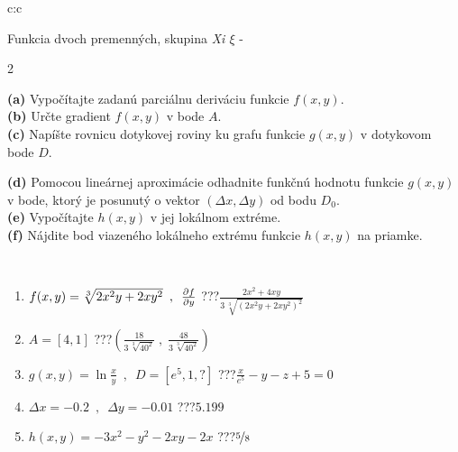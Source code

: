 \documentclass[10pt]{report}
\begin{document}
\begin{tabular}{c:c}
\begin{minipage}[c][104.5mm][t]{0.5\linewidth}
\begin{center}
\vspace{7mm}
{\huge \LARGE Funkcia dvoch premenných, skupina \textit{Xi $\xi$} -}\\[5mm]
\begin{minipage}{0.95\linewidth}
\begin{center}
{\small \begin{multicols}{2} \raggedright
\textbf{(a)} Vypočítajte zadanú parciálnu deriváciu funkcie \(f(x,y)\). \\[1mm]
\textbf{(b)} Určte gradient \(f(x,y)\) v bode \(A\). \\[1mm]
\textbf{(c)} Napíšte rovnicu dotykovej roviny ku grafu funkcie \(g(x,y)\) v dotykovom bode \(D\). \par \columnbreak
\textbf{(d)} Pomocou lineárnej aproximácie odhadnite funkčnú hodnotu funkcie \(g(x,y)\) v bode, ktorý je posunutý o vektor \((\Delta x, \Delta y)\) od bodu \(D_0\). \\[1mm]
\textbf{(e)} Vypočítajte \(h(x,y)\) v jej lokálnom extréme. \\[1mm]
\textbf{(f)} Nájdite bod viazeného lokálneho extrému funkcie \(h(x,y)\) na priamke. \\[1mm]
\end{multicols}
}
\end{center}
\end{minipage}
\\[4mm]
\begin{minipage}{0.79\linewidth}
\begin{center}
\begin{varwidth}{\linewidth}
\begin{enumerate}
\normalsizerr
\item $f(x,y) = \sqrt[3]{2x^2y + 2xy^2}\enspace , \enspace \pdv{f}{y}$\quad \dotfill\; ???\;\dotfill \quad $\frac{2x^2+4xy}{3\,\sqrt[3]{(2x^2y+2xy^2)^{2}}}$
\item $A = [4, 1]$\quad \dotfill\; ???\;\dotfill \quad $\left( \frac{18}{3\,\sqrt[3]{40^2}} \;,\; \frac{48}{3\,\sqrt[3]{40^2}} \right)$
\item $g(x,y) = \ln\frac{x}{y} \enspace , \enspace D=[e^{5},1,?]$\quad \dotfill\; ???\;\dotfill \quad $\frac{x}{e^5} - y - z + 5 = 0$
\item $\Delta x = {-0.2} \enspace,\enspace \Delta y = {-0.01}$\quad \dotfill\; ???\;\dotfill \quad $5.199$
\item $h(x,y) = -3x^2-y^2-2xy-2x$\quad \dotfill\; ???\;\dotfill \quad $\nicefrac{5}{8}$

\end{enumerate}
\end{varwidth}
\end{center}
\end{minipage}
\end{center}
\end{minipage}
\end{tabular}
\end{document}
